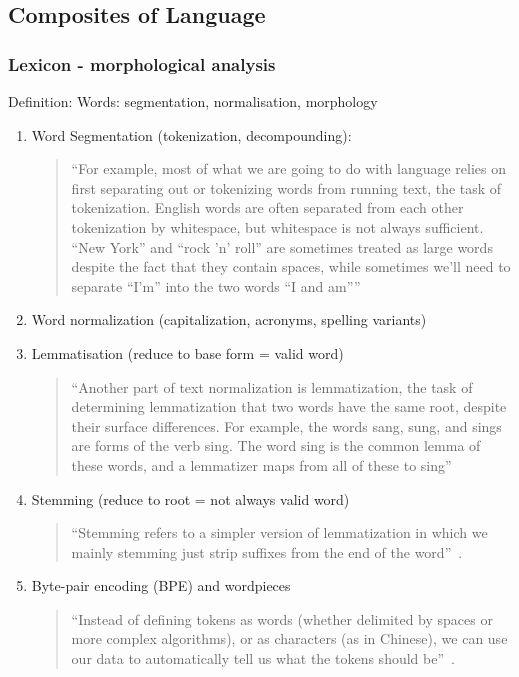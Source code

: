 \documentclass[11pt]{article}
\begin{document}
\subsection{Composites of Language}

\subsubsection{Lexicon - morphological analysis}

Definition: Words: segmentation, normalisation, morphology

\begin{enumerate}
    \item Word Segmentation (tokenization, decompounding): 
    \begin{quote}
        ``For example, most of what we are going to do with language relies on first separating out or tokenizing words from running text, the task of tokenization. English words are often separated from each other tokenization by whitespace, but whitespace is not always sufficient. ``New York'' and ``rock 'n' roll'' are sometimes treated as large words despite the fact that they contain spaces, while sometimes we'll need to separate ``I'm'' into the two words ``I and am''''~\cite{book-speech-and-language-processing}
    \end{quote}
    \item Word normalization (capitalization, acronyms, spelling variants)
    \item Lemmatisation (reduce to base form = valid word)
    \begin{quote}
        ``Another part of text normalization is lemmatization, the task of determining lemmatization that two words have the same root, despite their surface differences. For example, the words sang, sung, and sings are forms of the verb sing. The word sing is the common lemma of these words, and a lemmatizer maps from all of these to sing''~\cite{book-speech-and-language-processing}
    \end{quote}
    \item Stemming (reduce to root = not always valid word)
    \begin{quote}
        ``Stemming refers to a simpler version of lemmatization in which we mainly stemming just strip suffixes from the end of the word''~\cite{book-speech-and-language-processing}.
    \end{quote}
    \item Byte-pair encoding (BPE) and wordpieces
    \begin{quote}
        ``Instead of defining tokens as words (whether delimited by spaces or more complex algorithms), or as characters (as in Chinese), we can use our data to automatically tell us what the tokens should be''~\cite{book-speech-and-language-processing}.
    \end{quote}


\end{enumerate}
\end{document}
